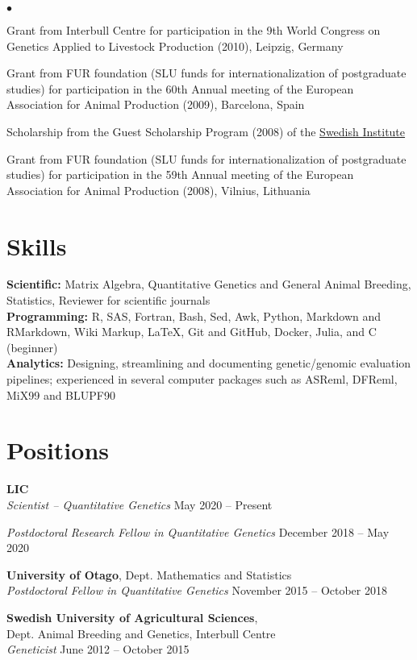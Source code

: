 \documentclass[margin,line]{res}
\newenvironment{list2}{
  \begin{list}{$\bullet$}{%
      \setlength{\itemsep}{0in}
      \setlength{\parsep}{0in} \setlength{\parskip}{0in}
      \setlength{\topsep}{0in} \setlength{\partopsep}{0in}
      \setlength{\leftmargin}{0.2in}}}{\end{list}}
\begin{document}
\begin{resume}
  \begin{list2}
    \item Grant from Interbull Centre for participation in the 9th World Congress on Genetics Applied to Livestock Production (2010), Leipzig, Germany
    \item Grant from FUR foundation (SLU funds for internationalization of postgraduate studies) for participation in the 60th Annual meeting of the European Association for Animal Production (2009), Barcelona, Spain
    \item Scholarship from the Guest Scholarship Program (2008) of the \href{https://si.se/en}{Swedish Institute}
    \item Grant from FUR foundation (SLU funds for internationalization of postgraduate studies) for participation in the 59th Annual meeting of the European Association for Animal Production (2008), Vilnius, Lithuania
  \end{list2}
  \section{\sc Skills}

   {\bf Scientific:} Matrix Algebra, Quantitative Genetics and General Animal Breeding, Statistics, Reviewer for scientific journals \\
  {\bf Programming:} R, SAS, Fortran, Bash, Sed, Awk, Python, Markdown and RMarkdown, Wiki Markup, \LaTeX{}, Git and GitHub, Docker, Julia, and C (beginner) \\
  {\bf Analytics:} Designing, streamlining and documenting genetic/genomic evaluation pipelines; experienced in several computer packages such as ASReml, DFReml, MiX99 and BLUPF90
  \section{\sc Positions}

   {\bf LIC} \\
  {\em Scientist -- Quantitative Genetics} \hfill{May 2020 -- Present}

  {\em Postdoctoral Research Fellow in Quantitative Genetics} \hfill{December 2018 -- May 2020}

  {\bf University of Otago}, Dept. Mathematics and Statistics \\
  {\em Postdoctoral Fellow in Quantitative Genetics} \hfill{November 2015 -- October 2018}

  {\bf Swedish University of Agricultural Sciences}, \\
  Dept. Animal Breeding and Genetics, Interbull Centre \\
  {\em Geneticist} \hfill{June 2012 -- October 2015}


\end{resume}
\end{document}
